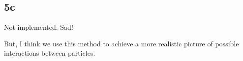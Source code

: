 \subsection{5c}
Not implemented. Sad!

But, I think we use this method to achieve a more realistic picture of
possible interactions between particles.
